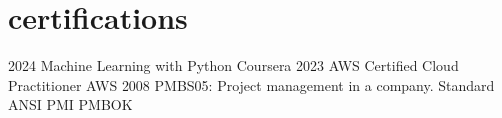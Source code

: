 \section{certifications}
\begin{entrylist}
  \certentry
    {2024}
    {\normalfont Machine Learning with Python}
    {Coursera}
  \certentry
    {2023}
    {\normalfont AWS Certified Cloud Practitioner}
    {AWS}
  \certentry
    {2008}
    {\normalfont PMBS05: Project management in a company. Standard ANSI PMI PMBOK}
    {}
\end{entrylist}
